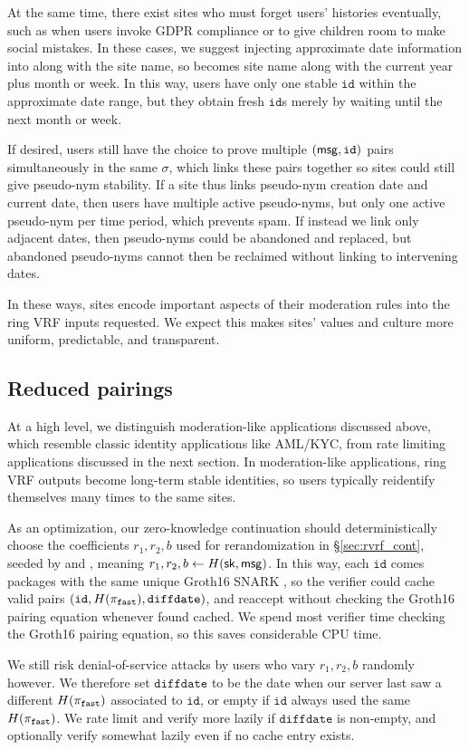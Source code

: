At the same time, there exist sites who must forget users' histories
eventually, such as when users invoke GDPR compliance or to give children
room to make social mistakes.  In these cases, we suggest injecting
approximate date information into \msg along with the site name,
so \msg becomes site name along with the current year plus month or week.
In this way, users have only one stable $\mathtt{id}$ within the
approximate date range, but they obtain fresh $\mathtt{id}$s merely
by waiting until the next month or week.

If desired, users still have the choice to prove multiple $(\mathsf{msg},\mathtt{id})$
pairs simultaneously in the same $\sigma$, which links these pairs
together so sites could still give pseudo-nym stability.
If a site thus links pseudo-nym creation date and current date, then
users have multiple active pseudo-nyms, but only one active pseudo-nym
per time period, which prevents spam.  If instead we link only adjacent
dates, then pseudo-nyms could be abandoned and replaced, but abandoned
pseudo-nyms cannot then be reclaimed without linking to intervening dates.

In these ways, sites encode important aspects of their moderation rules
into the ring VRF inputs requested.  We expect this makes sites' values
and culture more uniform, predictable, and transparent.


\subsection{Reduced pairings}
\label{sec:reduced_pairings}

At a high level, we distinguish moderation-like applications discussed
above, which resemble classic identity applications like AML/KYC, from
rate limiting applications discussed in the next section. 
%
In moderation-like applications, ring VRF outputs become long-term
stable identities, so users typically reidentify themselves many times
to the same sites.

As an optimization, our zero-knowledge continuation
should deterministically choose the coefficients $r_1,r_2,b$ used for
rerandomization in \S\ref{sec:rvrf_cont},
 seeded by \msg and \sk, meaning $r_1,r_2,b \leftarrow H(\mathsf{sk},\mathsf{msg})$. 
%
In this way, each $\mathtt{id}$ comes packages with the same unique
Groth16 SNARK \pifast, so the verifier could cache valid pairs
$(\mathtt{id},H(\pi_{\mathtt{fast}}),\mathtt{diffdate})$, and reaccept \pifast
without checking the Groth16 pairing equation whenever found cached.
%
We spend most verifier time checking the Groth16 pairing equation, so
this saves considerable CPU time. %

We still risk denial-of-service attacks by users who vary $r_1,r_2,b$ 
randomly however.  We therefore set $\mathtt{diffdate}$ to be the date
when our server last saw a different $H(\pi_{\mathtt{fast}})$ associated to
$\mathtt{id}$, or empty if $\mathtt{id}$ always used the same $H(\pi_{\mathtt{fast}})$.
We rate limit and verify more lazily if $\mathtt{diffdate}$ is non-empty,
and optionally verify somewhat lazily even if no cache entry exists.

